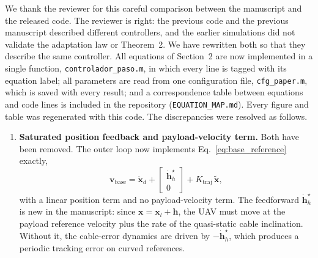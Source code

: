 
\begin{reply}
We thank the reviewer for this careful comparison between the manuscript and the released code. The reviewer is right: the previous code and the previous manuscript described different controllers, and the earlier simulations did not validate the adaptation law or Theorem~2. We have rewritten both so that they describe the same controller. All equations of Section~2 are now implemented in a single function, \texttt{controlador\_paso.m}, in which every line is tagged with its equation label; all parameters are read from one configuration file, \texttt{cfg\_paper.m}, which is saved with every result; and a correspondence table between equations and code lines is included in the repository (\texttt{EQUATION\_MAP.md}). Every figure and table was regenerated with this code. The discrepancies were resolved as follows.

\begin{enumerate}
\item \textbf{Saturated position feedback and payload-velocity term.} Both have been removed. The outer loop now implements Eq.~\eqref{eq:base_reference} exactly,
\begin{equation*}
\mathbf{v}_{\mathrm{base}}=\dot{\mathbf{x}}_d+\begin{bmatrix}\dot{\mathbf{h}}_h^\star\\0\end{bmatrix}+K_{\mathrm{traj}}\,\tilde{\mathbf{x}},
\end{equation*}
with a linear position term and no payload-velocity term. The feedforward $\dot{\mathbf{h}}_h^\star$ is new in the manuscript: since $\mathbf{x}=\mathbf{x}_l+\mathbf{h}$, the UAV must move at the payload reference velocity plus the rate of the quasi-static cable inclination. Without it, the cable-error dynamics are driven by $-\dot{\mathbf{h}}^\star_h$, which produces a periodic tracking error on curved references.


\end{enumerate}
\end{reply}
